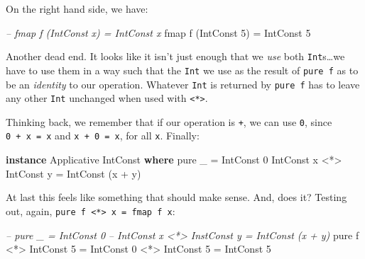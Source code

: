 \documentclass[]{article}
\newenvironment{Shaded}{}{}
\newcommand{\CommentTok}[1]{\textcolor[rgb]{0.38,0.63,0.69}{\textit{#1}}}
\newcommand{\DataTypeTok}[1]{\textcolor[rgb]{0.56,0.13,0.00}{#1}}
\newcommand{\DecValTok}[1]{\textcolor[rgb]{0.25,0.63,0.44}{#1}}
\newcommand{\FunctionTok}[1]{\textcolor[rgb]{0.02,0.16,0.49}{#1}}
\newcommand{\KeywordTok}[1]{\textcolor[rgb]{0.00,0.44,0.13}{\textbf{#1}}}
\newcommand{\NormalTok}[1]{#1}
\begin{document}
On the right hand side, we have:

\begin{Shaded}
\begin{Highlighting}[]
\CommentTok{-- fmap f (IntConst x) = IntConst x}
\NormalTok{fmap f (}\DataTypeTok{IntConst} \DecValTok{5}\NormalTok{) }\FunctionTok{=} \DataTypeTok{IntConst} \DecValTok{5}
\end{Highlighting}
\end{Shaded}

Another dead end. It looks like it isn't just enough that we \emph{use} both
\texttt{Int}s\ldots{}we have to use them in a way such that the \texttt{Int} we
use as the result of \texttt{pure\ f} as to be an \emph{identity} to our
operation. Whatever \texttt{Int} is returned by \texttt{pure\ f} has to leave
any other \texttt{Int} unchanged when used with
\texttt{\textless{}*\textgreater{}}.

Thinking back, we remember that if our operation is \texttt{+}, we can use
\texttt{0}, since \texttt{0\ +\ x\ =\ x} and \texttt{x\ +\ 0\ =\ x}, for all
\texttt{x}. Finally:

\begin{Shaded}
\begin{Highlighting}[]
\KeywordTok{instance} \DataTypeTok{Applicative} \DataTypeTok{IntConst} \KeywordTok{where}
\NormalTok{    pure _ }\FunctionTok{=} \DataTypeTok{IntConst} \DecValTok{0}
    \DataTypeTok{IntConst}\NormalTok{ x }\FunctionTok{<*>} \DataTypeTok{IntConst}\NormalTok{ y }\FunctionTok{=} \DataTypeTok{IntConst}\NormalTok{ (x }\FunctionTok{+}\NormalTok{ y)}
\end{Highlighting}
\end{Shaded}

At last this feels like something that should make sense. And, does it? Testing
out, again, \texttt{pure\ f\ \textless{}*\textgreater{}\ x\ =\ fmap\ f\ x}:

\begin{Shaded}
\begin{Highlighting}[]
\CommentTok{-- pure _ = IntConst 0}
\CommentTok{-- IntConst x <*> InstConst y = IntConst (x + y)}
\NormalTok{pure f }\FunctionTok{<*>} \DataTypeTok{IntConst} \DecValTok{5} \FunctionTok{=} \DataTypeTok{IntConst} \DecValTok{0} \FunctionTok{<*>} \DataTypeTok{IntConst} \DecValTok{5}
                      \FunctionTok{=} \DataTypeTok{IntConst} \DecValTok{5}
\end{Highlighting}
\end{Shaded}
\end{document}
